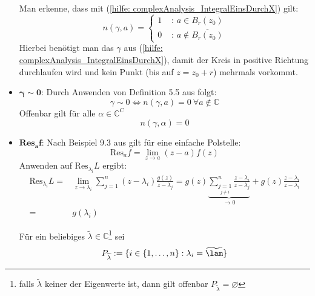 \documentclass[a4paper,12pt]{report}
\newcommand{\C}{\mathbb C}
\newcommand{\1}{\mathds{1}}
\newcommand{\Res}{\text{Res}}
\theoremstyle{plain} %
\theoremstyle{definition} %
\theoremstyle{remark}
\begin{document}
\begin{itemize}
                        Man erkenne, dass mit (\ref{hilfe: complexAnalysis_IntegralEinsDurchX}) gilt:
                        \begin{equation}
                              \label{hilfe: complexAnalysis_WindungNullEins}
                              n(\gamma,a) = \begin{cases}
                                    1& \text{ : }a\in B_r(z_0)\\
                                    0& \text{ : }a\notin\overline {B_r(z_0)}
                              \end{cases}
                        \end{equation}
                        Hierbei benötigt man das $\gamma$ aus (\ref{hilfe: complexAnalysis_IntegralEinsDurchX}),
                        damit der Kreis in positive Richtung durchlaufen wird und kein Punkt (bis auf $z=z_0+r$) mehrmals vorkommt.
                  \item $\mathbf{\gamma \sim 0}$:
                        Durch Anwenden von Definition 5.5 aus \cite[S. 67]{complexAnalysis} folgt:
                        $$\gamma \sim 0 \Leftrightarrow n(\gamma, a)=0\ \forall a\notin \C$$
                        Offenbar gilt für alle $\alpha \in \C^C$
                        $$n(\gamma, \alpha) = 0$$

                  \item $\mathbf{\Res_af}$:
                        Nach Beispiel 9.3 aus \cite[S. 142]{complexAnalysis} gilt für eine einfache Polstelle:
                        \begin{equation}
                              \label{hilfe: complexAnalysis_Residuum}
                              \Res_af = \lim_{z\to a} (z-a)f(z)
                        \end{equation}
                        Anwenden auf $\Res_{\lambda_i}L$ ergibt:
                        \begin{align*}
                              \Res_{\lambda_i}L =& \lim_{z\to \lambda_i} \sum_{j=1}^{n} (z-\lambda_i)\frac{g(z)}{z-\lambda_j}
                              = g(z)\underbrace{\sum_{\underset{j\ne i}{j=1}}^{n} \frac{z-\lambda_i}{z-\lambda_j}}_{\to 0} + g(z)\frac{z-\lambda_i}{z-\lambda_i} \\
                              =& g(\lambda_i)
                        \end{align*}

                        Für ein beliebiges $\widetilde \lambda \in \C$\footnote{falls $\widetilde{\lambda}$ keiner der Eigenwerte ist,
                        dann gilt offenbar $P_{\widetilde \lambda} = \varnothing$} sei
                        $$P_{\widetilde \lambda} :=\{i\in\{1,\dots,n\}: \lambda_i = \widetilde{\lam}\}$$


\end{itemize}
\end{document}
